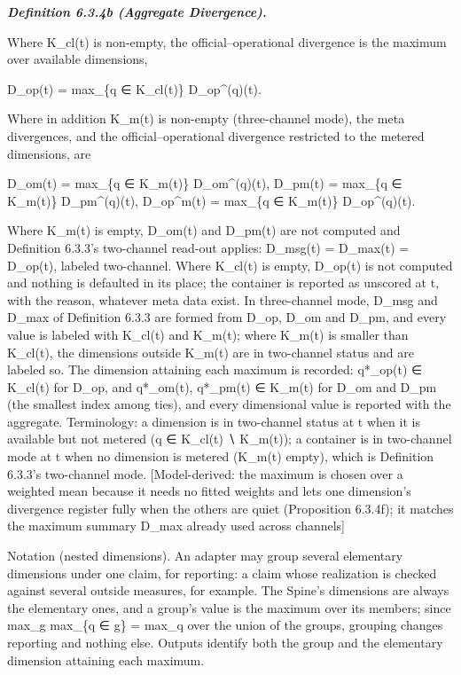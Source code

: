 \documentclass[
]{article}
\begin{document}
\emph{\textbf{Definition 6.3.4b (Aggregate Divergence).}}

Where K\_cl(t) is non-empty, the official--operational divergence is the
maximum over available dimensions,

D\_op(t) = max\_\{q ∈ K\_cl(t)\} D\_op\^{}(q)(t).

Where in addition K\_m(t) is non-empty (three-channel mode), the meta
divergences, and the official--operational divergence restricted to the
metered dimensions, are

D\_om(t) = max\_\{q ∈ K\_m(t)\} D\_om\^{}(q)(t), D\_pm(t) = max\_\{q ∈
K\_m(t)\} D\_pm\^{}(q)(t), D\_op\^{}m(t) = max\_\{q ∈ K\_m(t)\}
D\_op\^{}(q)(t).

Where K\_m(t) is empty, D\_om(t) and D\_pm(t) are not computed and
Definition 6.3.3's two-channel read-out applies: D\_msg(t) = D\_max(t) =
D\_op(t), labeled two-channel. Where K\_cl(t) is empty, D\_op(t) is not
computed and nothing is defaulted in its place; the container is
reported as unscored at t, with the reason, whatever meta data exist. In
three-channel mode, D\_msg and D\_max of Definition 6.3.3 are formed
from D\_op, D\_om and D\_pm, and every value is labeled with K\_cl(t)
and K\_m(t); where K\_m(t) is smaller than K\_cl(t), the dimensions
outside K\_m(t) are in two-channel status and are labeled so. The
dimension attaining each maximum is recorded: q*\_op(t) ∈ K\_cl(t) for
D\_op, and q*\_om(t), q*\_pm(t) ∈ K\_m(t) for D\_om and D\_pm (the
smallest index among ties), and every dimensional value is reported with
the aggregate. Terminology: a dimension is in two-channel status at t
when it is available but not metered (q ∈ K\_cl(t) ∖ K\_m(t)); a
container is in two-channel mode at t when no dimension is metered
(K\_m(t) empty), which is Definition 6.3.3's two-channel mode.
{[}Model-derived: the maximum is chosen over a weighted mean because it
needs no fitted weights and lets one dimension's divergence register
fully when the others are quiet (Proposition 6.3.4f); it matches the
maximum summary D\_max already used across channels{]}

Notation (nested dimensions). An adapter may group several elementary
dimensions under one claim, for reporting: a claim whose realization is
checked against several outside measures, for example. The Spine's
dimensions are always the elementary ones, and a group's value is the
maximum over its members; since max\_g max\_\{q ∈ g\} = max\_q over the
union of the groups, grouping changes reporting and nothing else.
Outputs identify both the group and the elementary dimension attaining
each maximum.
\end{document}
